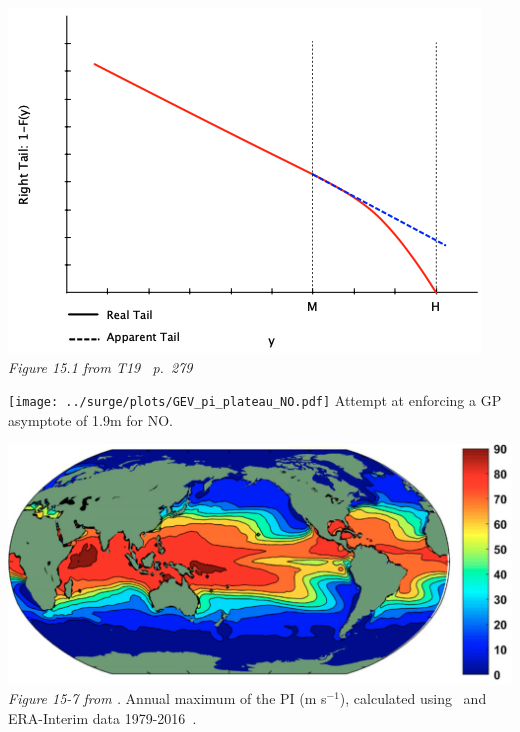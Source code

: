 \begin{frame}{%
}
\centering
\vspace{-1pt}
 \begin{minipage}{0.45\textwidth}
    \centering
    \includegraphics[width=1\linewidth]{images/taleb-limit-slimmed.png}\\
    \textit{Figure 15.1 from T19~\cite{taleb2019statistical} p.~279}
   \end{minipage} \begin{minipage}{0.45\textwidth}
   \texttt{[image: ../surge/plots/GEV\_pi\_plateau\_NO.pdf]}
   Attempt at enforcing a GP asymptote of 1.9m for NO.
   \end{minipage}
\includegraphics[width=0.7\linewidth]{images/PI-max-year.png}\\
\textit{Figure 15-7 from \cite{emanuel2018progress}.}
Annual maximum of the PI (m s$^{-1}$), calculated using~\cite{bister2002low}
and ERA-Interim data 1979-2016~\cite{dee2011era, berrisford2009era}.

\end{frame}



